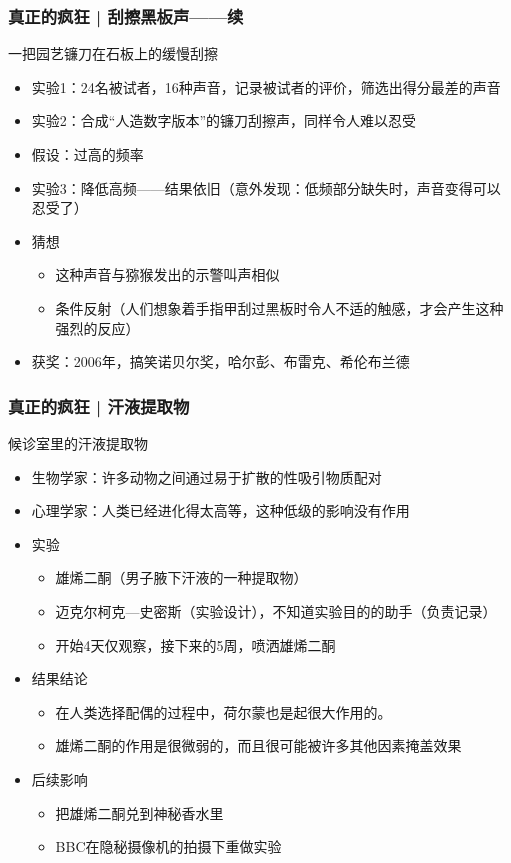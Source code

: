 \begin{frame}
  \frametitle{真正的疯狂 | 刮擦黑板声——续}
  \begin{block}{一把园艺镰刀在石板上的缓慢刮擦}
    \begin{itemize}
      \item 实验1：24名被试者，16种声音，记录被试者的评价，筛选出得分最差的声音
      \item 实验2：合成“人造数字版本”的镰刀刮擦声，同样令人难以忍受
      \item 假设：过高的频率
      \item 实验3：降低高频——结果依旧（意外发现：低频部分缺失时，声音变得可以忍受了）
      \item 猜想
        \begin{itemize}
          \item 这种声音与猕猴发出的示警叫声相似
          \item 条件反射（人们想象着手指甲刮过黑板时令人不适的触感，才会产生这种强烈的反应）
        \end{itemize}
      \item 获奖：2006年，搞笑诺贝尔奖，哈尔彭、布雷克、希伦布兰德
    \end{itemize}
  \end{block}
\end{frame}

\begin{frame}
  \frametitle{真正的疯狂 | 汗液提取物}
  \begin{block}{候诊室里的汗液提取物}
    \begin{itemize}
      \item 生物学家：许多动物之间通过易于扩散的性吸引物质配对
      \item 心理学家：人类已经进化得太高等，这种低级的影响没有作用
    \pause
      \item 实验
        \begin{itemize}
          \item 雄烯二酮（男子腋下汗液的一种提取物）
          \item 迈克尔\textbullet 柯克—史密斯（实验设计），不知道实验目的的助手（负责记录）
          \item 开始4天仅观察，接下来的5周，喷洒雄烯二酮
        \end{itemize}
      \item 结果结论
        \begin{itemize}
          \item 在人类选择配偶的过程中，荷尔蒙也是起很大作用的。
          \item 雄烯二酮的作用是很微弱的，而且很可能被许多其他因素掩盖效果
        \end{itemize}
      \item 后续影响
        \begin{itemize}
          \item 把雄烯二酮兑到神秘香水里
          \item BBC在隐秘摄像机的拍摄下重做实验
        \end{itemize}
    \end{itemize}
  \end{block}
\end{frame}

